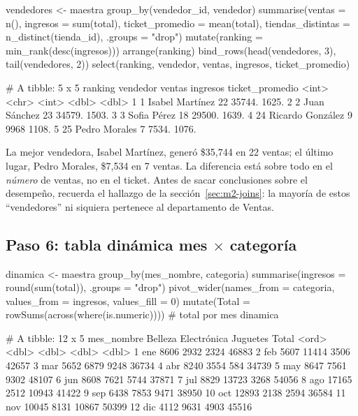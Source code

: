 \begin{rcode}[title=Reporte mensual: vendedores]
vendedores <- maestra %
  group_by(vendedor_id, vendedor) %
  summarise(ventas = n(), ingresos = sum(total),
            ticket_promedio = mean(total),
            tiendas_distintas = n_distinct(tienda_id), .groups = "drop") %
  mutate(ranking = min_rank(desc(ingresos))) %
  arrange(ranking)
bind_rows(head(vendedores, 3), tail(vendedores, 2)) %
  select(ranking, vendedor, ventas, ingresos, ticket_promedio)
\end{rcode}
\begin{rsalida}
# A tibble: 5 x 5
  ranking vendedor         ventas ingresos ticket_promedio
    <int> <chr>             <int>    <dbl>           <dbl>
1       1 Isabel Martínez      22   35744.           1625.
2       2 Juan Sánchez         23   34579.           1503.
3       3 Sofia Pérez          18   29500.           1639.
4      24 Ricardo González      9    9968            1108.
5      25 Pedro Morales         7    7534.           1076.
\end{rsalida}

La mejor vendedora, Isabel Martínez, generó \$35,744 en 22 ventas; el
último lugar, Pedro Morales, \$7,534 en 7 ventas. La diferencia está sobre
todo en el \emph{número} de ventas, no en el ticket. Antes de sacar
conclusiones sobre el desempeño, recuerda el hallazgo de la
sección~\ref{sec:m2-joins}: la mayoría de estos ``vendedores'' ni siquiera
pertenece al departamento de Ventas.

\subsection{Paso 6: tabla dinámica mes \texorpdfstring{$\times$}{x} categoría}

\begin{rcode}[title=Reporte mensual: tabla dinámica]
dinamica <- maestra %
  group_by(mes_nombre, categoria) %
  summarise(ingresos = round(sum(total)), .groups = "drop") %
  pivot_wider(names_from = categoria, values_from = ingresos,
              values_fill = 0) %
  mutate(Total = rowSums(across(where(is.numeric))))  # total por mes
dinamica %
\end{rcode}
\begin{rsalida}
# A tibble: 12 x 5
   mes_nombre Belleza Electrónica Juguetes Total
   <ord>        <dbl>       <dbl>    <dbl> <dbl>
 1 ene           8606        2932     2324 46883
 2 feb           5607       11414     3506 42657
 3 mar           5652        6879     9248 36734
 4 abr           8240        3554      584 34739
 5 may           8647        7561     9302 48107
 6 jun           8608        7621     5744 37871
 7 jul           8829       13723     3268 54056
 8 ago          17165        2512    10943 41422
 9 sep           6438        7853     9471 38950
10 oct          12893        2138     2594 36584
11 nov          10045        8131    10867 50399
12 dic           4112        9631     4903 45516
\end{rsalida}

